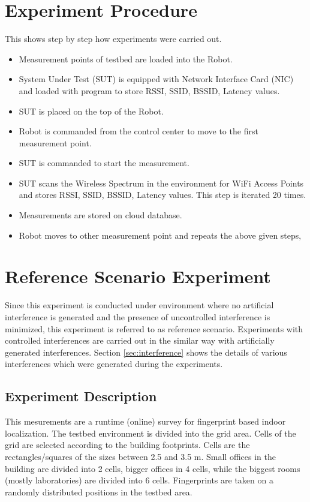 \documentclass[11pt,a4paper,headinclude,footinclude,chapterprefix=on]{scrreprt}
\begin{document}
\section{Experiment Procedure} This shows step by step how experiments were carried out. 
\begin{itemize}
	\item Measurement points of testbed are loaded into the Robot. 
	\item System Under Test (SUT) is equipped with Network Interface Card (NIC) and loaded with program to store RSSI, SSID, BSSID, Latency values. 
	\item SUT is placed on the top of the Robot. 
	\item Robot is commanded from the control center to move to the first measurement point. 
	\item SUT is commanded to start the measurement. 
	\item SUT scans the Wireless Spectrum in the environment for WiFi Access Points and stores RSSI, SSID, BSSID, Latency values. This step is iterated 20 times. 
	\item Measurements are stored on cloud database. 
	\item Robot moves to other measurement point and repeats the above given steps‚ 
\end{itemize}

\section{Reference Scenario Experiment} Since this experiment is conducted under environment where no artificial interference is generated and the presence of uncontrolled interference is minimized, this experiment is referred to as reference scenario. Experiments with controlled interferences are carried out in the similar way with artificially generated interferences. Section \ref{sec:interference} shows the details of various interferences which were generated during the experiments.

\subsection{Experiment Description} This mesurements are a runtime (online) survey for fingerprint based indoor localization. The testbed environment is divided into the grid area. Cells of the grid are selected according to the building footprints. Cells are the rectangles/squares of the sizes between 2.5 and 3.5 m. Small offices in the building are divided into 2 cells, bigger offices in 4 cells, while the biggest rooms (mostly laboratories) are divided into 6 cells. Fingerprints are taken on a randomly distributed positions in the testbed area.
\end{document}
